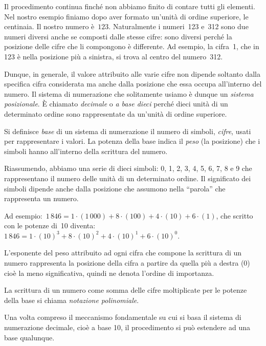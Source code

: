 Il procedimento continua finché non abbiamo finito di contare tutti gli elementi. Nel nostro esempio finiamo dopo aver formato
un'unità di ordine superiore, le centinaia. Il nostro numero è~$123$.
Naturalmente i numeri~123 e~312 sono due numeri diversi anche se composti dalle stesse cifre: sono diversi
perché la posizione delle cifre che li compongono è differente. Ad esempio, la cifra~1, che in 123 è nella posizione più a sinistra,
si trova al centro del numero~312.

Dunque, in generale, il valore attribuito alle varie cifre non dipende soltanto dalla specifica cifra considerata ma
anche dalla posizione che essa occupa all'interno del numero. Il sistema di numerazione
che solitamente usiamo è dunque un \emph{sistema posizionale}. \`E chiamato \emph{decimale} o \emph{a base
dieci} perché dieci unità di un determinato ordine sono rappresentate da un'unità di ordine superiore.

\begin{definizione}\label{def:base}
Si definisce \emph{base} di un sistema di numerazione il numero di
simboli, \emph{cifre}, usati per rappresentare i valori. La potenza della base indica il \emph{peso} (la posizione)
che i simboli hanno all'interno della scrittura del numero.
\end{definizione}

Riassumendo, abbiamo una serie di dieci simboli: 0, 1, 2, 3, 4, 5, 6, 7,
8 e 9 che rappresentano il numero delle unità di un determinato ordine.
Il significato dei simboli dipende anche dalla posizione che assumono
nella ``parola'' che rappresenta un numero.

Ad esempio:~$1\,846=1\cdot(1\,000)+8\cdot(100)+4\cdot(10)+6\cdot(1)$, che scritto con le potenze di~10 diventa:
$1\,846=1\cdot(10)^{3}+8\cdot (10)^{2}+4\cdot (10)^{1}+6\cdot (10)^{0}$.

L'esponente del peso attribuito ad ogni cifra che compone la scrittura di un numero
rappresenta la posizione della cifra a partire da quella più a destra (0) cioè la meno significativa,
quindi ne denota l'ordine di importanza.

\begin{definizione}
La scrittura di un numero come somma delle cifre moltiplicate per le potenze della
base si chiama \emph{notazione polinomiale}.
\end{definizione}

Una volta compreso il meccanismo fondamentale su cui si basa il sistema
di numerazione decimale, cioè a base 10, il procedimento si può estendere ad una base
qualunque.

